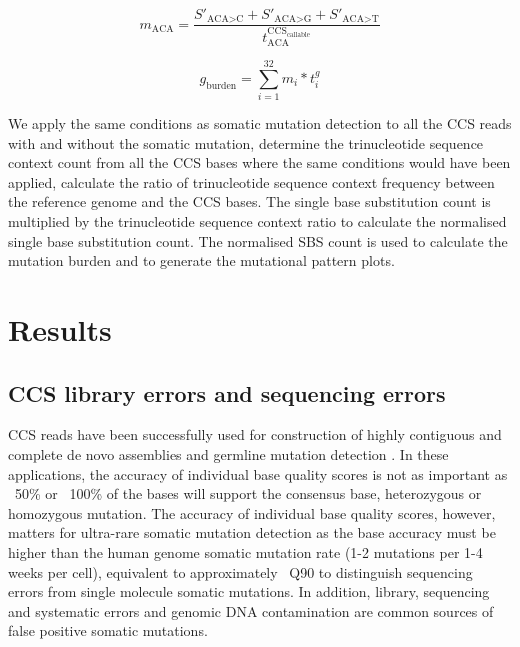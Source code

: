 \begin{equation}
m_{\text{ACA}} = \frac{S'_{\text{ACA>C}} + S'_{\text{ACA>G}} + S'_{\text{ACA>T}}}{t^{\text{CCS}_{\text{callable}}}_{\text{ACA}}} 
\end{equation}

\begin{equation}
g_{\text{burden}} = \sum^{32}_{i=1} m_{i} * t^{g}_{i}
\end{equation}




We apply the same conditions as somatic mutation detection to all the CCS reads with and without the somatic mutation, determine the trinucleotide sequence context count from all the CCS bases where the same conditions would have been applied, calculate the ratio of trinucleotide sequence context frequency between the reference genome and the CCS bases. The single base substitution count is multiplied by the trinucleotide sequence context ratio to calculate the normalised single base substitution count. The normalised SBS count is used to calculate the mutation burden and to generate the mutational pattern plots. 

 \section{Results}

\subsection{CCS library errors and sequencing errors}

CCS reads have been successfully used for construction of highly contiguous and complete de novo assemblies \cite{} and germline mutation detection \cite{}. In these applications, the accuracy of individual base quality scores is not as important as ~50\% or ~100\% of the bases will support the consensus base, heterozygous or homozygous mutation. The accuracy of individual base quality scores, however, matters for ultra-rare somatic mutation detection as the base accuracy must be higher than the human genome somatic mutation rate (1-2 mutations per 1-4 weeks per cell), equivalent to approximately ~Q90 to distinguish sequencing errors from single molecule somatic mutations. In addition, library, sequencing and systematic errors and genomic DNA contamination are common sources of false positive somatic mutations. 

